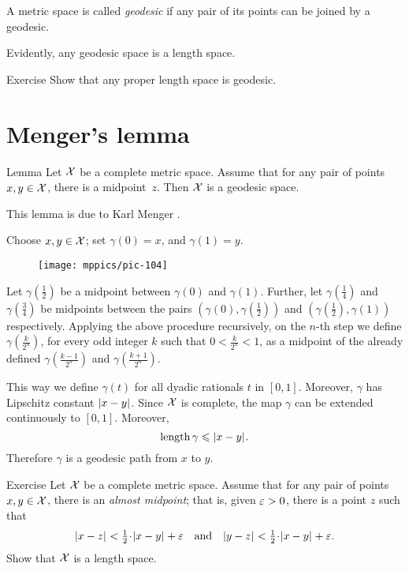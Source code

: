 A metric space is called \emph{geodesic} if any pair of its points can be joined by a geodesic.

Evidently, any geodesic space is a length space.

\begin{thm}{Exercise}\label{ex:compact-length}
Show that any proper length space is geodesic.
\end{thm}

\section{Menger's lemma}

\begin{thm}{Lemma}\label{lem:mid>geod}
Let $\mathcal{X}$ be a complete metric space.
Assume that for any pair of points $x,y\in \mathcal{X}$, 
there is a midpoint~$z$.
Then $\mathcal{X}$ is a geodesic space.

\end{thm}

This lemma is due to Karl Menger \cite[Section 6]{menger}.


Choose $x,y\in \mathcal{X}$;
set $\gamma(0)=x$, and $\gamma(1)=y$.

\begin{figure}[ht!]
\vskip-0mm
\centering
\texttt{[image: mppics/pic-104]}
\end{figure}

Let $\gamma(\tfrac12)$ be a midpoint between $\gamma(0)$ and $\gamma(1)$.
Further, let $\gamma(\frac14)$ 
and $\gamma(\frac34)$ be midpoints between the pairs $(\gamma(0),\gamma(\tfrac12))$ 
and $(\gamma(\tfrac12),\gamma(1))$ respectively.
Applying the above procedure recursively,
on the $n$-th step we define $\gamma(\tfrac{k}{2^n})$,
for every odd integer $k$ such that $0<\tfrac k{2^n}<1$, 
as a midpoint of the already defined
$\gamma(\tfrac{k-1}{2^n})$ and $\gamma(\tfrac{k+1}{2^n})$.

This way we define $\gamma(t)$ for all dyadic rationals $t$ in $[0,1]$.
Moreover, $\gamma$ has Lipschitz constant $|{x}-{y}|_{}^{{}}$.
Since $\mathcal{X}$ is complete, the map $\gamma$ can be extended continuously to $[0,1]$.
Moreover,
\[
\mathop{\rm length}\nolimits\gamma\leqslant |{x}-{y}|_{}^{{}}.
\]
Therefore $\gamma$ is a geodesic path from $x$ to $y$.
\qedsf

\begin{thm}{Exercise}\label{ex:menger}
Let $\mathcal{X}$ be a complete metric space.
Assume that for any pair of points $x,y\in \mathcal{X}$, 
there is an \emph{almost midpoint};
that is, given $\varepsilon>0$, there is a point $z$ such that 
\[\dist{x}{z}{}<\tfrac12\cdot\dist{x}{y}{}+\eps 
\quad\text{and}\quad
\dist{y}{z}{}<\tfrac12\cdot\dist{x}{y}{}+\eps.\]
Show that $\mathcal{X}$ is a length space.
\end{thm}


